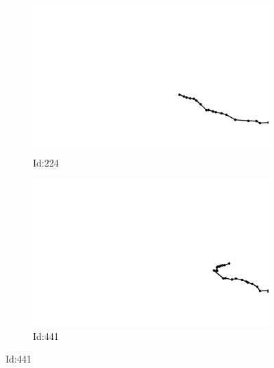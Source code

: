 \documentclass[12pt,twoside]{report}
\begin{document}
\begin{figure}
\centering
\begin{subfigure}[b]{0.20\textwidth}
\centering
\includegraphics[width=\textwidth]{../../trajectories/224.png}
\caption{Id:224}
\end{subfigure}
\begin{subfigure}[b]{0.20\textwidth}
\centering
\includegraphics[width=\textwidth]{../../trajectories/441.png}
\caption{Id:441}
\end{subfigure}
\end{figure}
\end{document}
